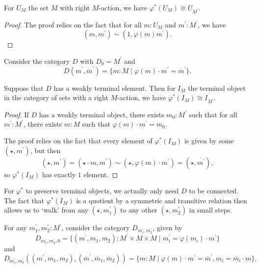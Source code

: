 \begin{lemma}\label{lem:scalar-extension-monoid-monoid-action}
  For $ U_M $ the set $ M $ with right $ M $-action, we have $ \varphi^*(U_M) \cong U_{M^\prime} $.
\end{lemma}
\begin{proof}
  The proof relies on the fact that for all $ m: U_M $ and $ m^\prime : M^\prime $, we have
  \[ (m, m^\prime) \sim (1, \varphi(m) m^\prime). \]
\end{proof}

Consider the category $ D $ with $ D_0 = M^\prime $ and
\[ D(m^\prime, \overline m^\prime) = \{ m: M \mid \varphi(m) \cdot m^\prime = \overline m^\prime \}. \]

\begin{lemma}\label{lem:scalar-extension-terminal}
  Suppose that $ D $ has a weakly terminal element. Then for $ I_M $ the terminal object in the category of sets with a right $ M $-action, we have $ \varphi^*(I_M) \cong I_{M^\prime} $.
\end{lemma}
\begin{proof}
  If $ D $ has a weakly terminal object, there exists $ m_0 : M^\prime $ such that for all $ m^\prime: M^\prime $, there exists $ m: M $ such that $ \varphi(m) \cdot m^\prime = m_0 $.

  The proof relies on the fact that every element of $ \varphi^*(I_M) $ is given by some $ (\star, m^\prime) $, but then
  \[ (\star, m^\prime) = (\star \cdot m, m^\prime) \sim (\star, \varphi(m) \cdot m^\prime) = (\star, \overline{m^\prime}), \]
  so $ \varphi^*(I_M) $ has exactly $ 1 $ element.
\end{proof}

\begin{remark}
  For $ \varphi^* $ to preserve terminal objects, we actually only need $ D $ to be connected. The fact that $ \varphi^*(I_M) $ is a quotient by a symmetric and transitive relation then allows us to `walk' from any $ (\star, m^\prime_1) $ to any other $ (\star, m^\prime_2) $ in small steps.
\end{remark}

For any $ m^\prime_1, m^\prime_2: M^\prime $, consider the category $ D_{m^\prime_1, m^\prime_2} $, given by
\[ D_{m^\prime_1, m^\prime_2, 0} = \{ (m^\prime, m_1, m_2): M^\prime \times M \times M \mid m_i^\prime = \varphi(m_i) \cdot m^\prime \} \]
and
\[ D_{m^\prime_1, m^\prime_2}((m^\prime, m_1, m_2), (\overline m^\prime, \overline m_1, \overline m_2)) = \{ m: M \mid \varphi(m) \cdot m^\prime = \overline m^\prime, m_i = \overline m_i \cdot m \}. \]

